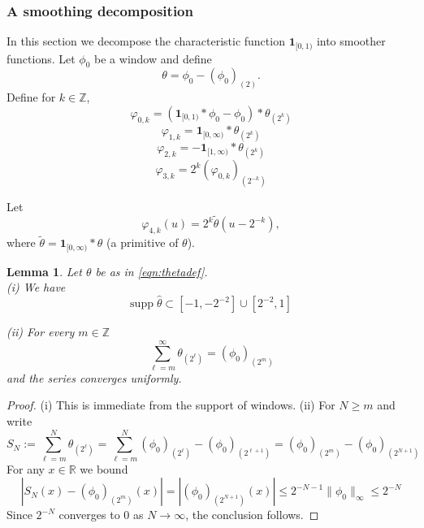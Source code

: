 \documentclass[12pt,reqno]{amsart}
\theoremstyle{plain}
\newtheorem{lemma}[theorem]{Lemma}
\numberwithin{equation}{section}
\theoremstyle{remark}
\newcommand{\R}{{\mathbb R}}
\begin{document}
\subsubsection{A smoothing decomposition}
In this section we  decompose the characteristic function $\mathbf{1}_{[0,1)}$ into smoother functions.
Let $\phi_0$ be a window and define
\begin{equation}\label{eqn:thetadef}
{\theta}={\phi_0}-{(\phi_0)}_{(2)}.
\end{equation}
Define for $k\in\mathbb{Z}$,
\begin{equation}\label{eqn:varphi0kdef}
\varphi_{0,k} = (\mathbf{1}_{[0,1)}\ast\phi_0 - \phi_0)\ast \theta_{(2^{k})}
\end{equation}
\begin{equation}\label{eqn:varphi1kdef}\varphi_{1,k} = \mathbf{1}_{[0,\infty)}\ast\theta_{(2^k)}
\end{equation}
\begin{equation}\label{eqn:varphi2kdef}\varphi_{2,k} = -\mathbf{1}_{[1,\infty)}\ast\theta_{(2^k)}
\end{equation}
\begin{equation}\label{eqn:varphi3def}
\varphi_{3,k} = 2^{k}(\varphi_{0,k})_{(2^{-k})}
\end{equation}

Let
\begin{equation}\label{eqn:varphi4kdef}
\varphi_{4,k}(u)=2^k\widetilde{\theta}(u-2^{-k}),
\end{equation}
where $\widetilde{\theta}=\mathbf{1}_{[0,\infty)}*\theta$ (a primitive of $\theta$).


\begin{lemma}\label{lem:bumpbasic}
Let $\theta$ be as in \eqref{eqn:thetadef}.\\

(i) We have
\begin{equation}\label{auto:theta-Fourier-support} \mathrm{supp}\;\widehat{\theta} \subset [-1,-2^{-2}]\cup [2^{-2},1] \end{equation}

(ii) For every $m\in\mathbb{Z}$
\begin{equation}\label{auto:theta-telescoping-sum} \sum_{\ell=m}^\infty \theta_{(2^\ell)} = (\phi_0)_{(2^m)} \end{equation}
and the series converges uniformly.
\end{lemma}

\begin{proof}
(i) This is immediate from the support of windows.
(ii) For  $N\ge m$ and write
\[ S_N := \sum_{\ell=m}^N \theta_{(2^\ell)} =  \sum_{\ell=m}^N (\phi_0)_{(2^\ell)} - (\phi_0)_{(2^{\ell+1})} = (\phi_0)_{(2^m)} - (\phi_0)_{(2^{N+1})} \]
For any $x\in \R$ we  bound
\[|S_N(x)-(\phi_0)_{(2^m)}(x)| = |(\phi_0)_{(2^{N+1})}(x)|  \le 2^{-N-1}\|\phi_0\|_\infty \le 2^{-N} \]
Since $2^{-N}$ converges   to $0$ as $N\to \infty$, the conclusion follows.
\end{proof}
\end{document}
